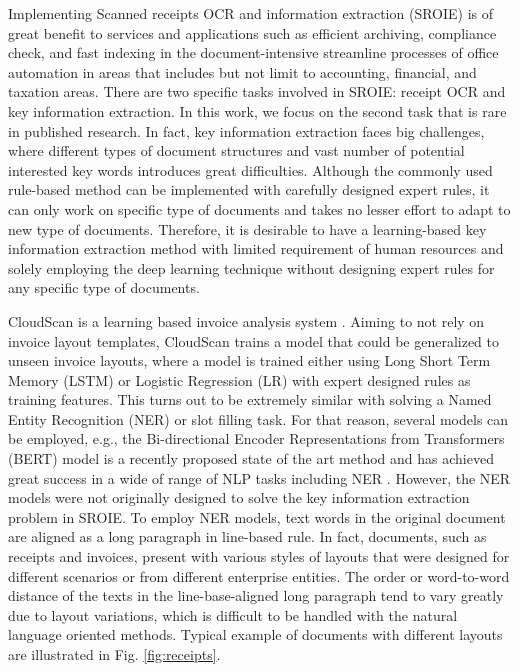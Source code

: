 \documentclass[10pt,twocolumn,letterpaper]{article}
\begin{document}
Implementing Scanned receipts OCR and information extraction (SROIE) is of great benefit to services and applications such as efficient archiving, compliance check, and fast indexing in the document-intensive streamline processes of office automation in areas that includes but not limit to accounting, financial, and taxation areas. There are two specific tasks involved in SROIE: receipt OCR and key information extraction. In this work, we focus on the second task that is rare in published research. In fact, key information extraction faces big challenges, where different types of document structures and vast number of potential interested key words introduces great difficulties. Although the commonly used rule-based method can be implemented with carefully designed expert rules, it can only work on specific type of documents and takes no lesser effort to adapt to new type of documents. Therefore, it is desirable to have a learning-based key information extraction method with limited requirement of human resources and solely employing the deep learning technique without designing expert rules for any specific type of documents. 

CloudScan is a learning based invoice analysis system \cite{cloudscan}. Aiming to not rely on invoice layout templates, CloudScan trains a model that could be generalized to unseen invoice layouts, where a model is trained either using Long Short Term Memory (LSTM) or Logistic Regression (LR) with expert designed rules as training features. This turns out to be extremely similar with solving a Named Entity Recognition (NER) or slot filling task. For that reason, several models can be employed, e.g., the Bi-directional Encoder Representations from Transformers (BERT) model is a recently proposed state of the art method and has achieved great success in a wide of range of NLP tasks including NER \cite{bert}. However, the NER models were not originally designed to solve the key information extraction problem in SROIE. To employ NER models, text words in the original document are aligned as a long paragraph in line-based rule. In fact, documents, such as receipts and invoices, present with various styles of layouts that were designed for different scenarios or from different enterprise entities. The order or word-to-word distance of the texts in the line-base-aligned long paragraph tend to vary greatly due to layout variations, which is difficult to be handled with the natural language oriented methods. Typical example of documents with different layouts are illustrated in Fig. \ref{fig:receipts}.
\end{document}
